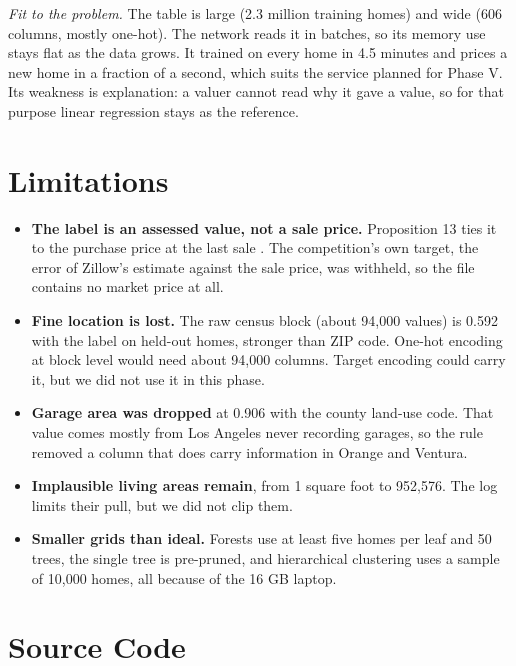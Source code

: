 \documentclass[sigconf,nonacm,10pt]{acmart}
\begin{document}
\emph{Fit to the problem.} The table is large (2.3 million training homes) and wide (606 columns, mostly one-hot). The network reads it in batches, so its memory use stays flat as the data grows. It trained on every home in 4.5 minutes and prices a new home in a fraction of a second, which suits the service planned for Phase V. Its weakness is explanation: a valuer cannot read why it gave a value, so for that purpose linear regression stays as the reference.

\section{Limitations}
\label{sec:limits}

\begin{itemize}
\item \textbf{The label is an assessed value, not a sale price.} Proposition 13 ties it to the purchase price at the last sale \cite{prop13}. The competition's own target, the error of Zillow's estimate against the sale price, was withheld, so the file contains no market price at all.
\item \textbf{Fine location is lost.} The raw census block (about 94,000 values) is 0.592 with the label on held-out homes, stronger than ZIP code. One-hot encoding at block level would need about 94,000 columns. Target encoding \cite{miccibarreca2001} could carry it, but we did not use it in this phase.
\item \textbf{Garage area was dropped} at 0.906 with the county land-use code. That value comes mostly from Los Angeles never recording garages, so the rule removed a column that does carry information in Orange and Ventura.
\item \textbf{Implausible living areas remain}, from 1 square foot to 952,576. The log limits their pull, but we did not clip them.
\item \textbf{Smaller grids than ideal.} Forests use at least five homes per leaf and 50 trees, the single tree is pre-pruned, and hierarchical clustering uses a sample of 10,000 homes, all because of the 16 GB laptop.
\end{itemize}

\section{Source Code}
\label{sec:code}
\end{document}
